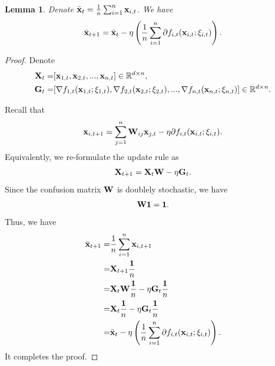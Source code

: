 \documentclass{article}
\newtheorem{Lemma}{\bf{Lemma}}
\begin{document}
\begin{Lemma}
\label{lemma_average_update_rule}
Denote $\bar{{\bf x}}_t = \frac{1}{n}\sum_{i=1}^n {\bf x}_{i,t}$. We have
\begin{align}
\nonumber
\bar{{\bf x}}_{t+1} =  \bar{{\bf x}}_{t} - \eta \left( \frac{1}{n} \sum_{i=1}^n \partial f_{i,t}({\bf x}_{i,t}; \xi_{i,t}) \right). 
\end{align}
\end{Lemma}
\begin{proof}
Denote 
\begin{align}
\nonumber
{\bf X}_t = &  [{\bf x}_{1,t}, {\bf x}_{2,t}, ..., {\bf x}_{n,t}] \in \mathbb{R}^{d\times n}, \\ \nonumber
{\bf G}_t = & [\nabla f_{1,t}({\bf x}_{1,t};\xi_{1,t}), \nabla f_{2,t}({\bf x}_{2,t};\xi_{2,t}), ..., \nabla f_{n,t}({\bf x}_{n,t};\xi_{n,t})] \in \mathbb{R}^{d\times n}.
\end{align}

Recall that 
\begin{align}
\nonumber
{\bf x}_{i,t+1} = \sum_{j=1}^n {\bf W}_{ij}{\bf x}_{j,t} - \eta \partial f_{i,t}({\bf x}_{i,t};\xi_{i,t}).
\end{align} Equivalently, we re-formulate the update rule as
\begin{align}
\nonumber
{\bf X}_{t+1} = {\bf X}_{t}{\bf W} - \eta {\bf G}_t.
\end{align} Since the confusion matrix ${\bf W}$ is doublely stochastic, we have
\begin{align}
\nonumber
{\bf W} {\bf 1} = {\bf 1}.
\end{align} Thus, we have
\begin{align}
\nonumber
\bar{{\bf x}}_{t+1} = & \frac{1}{n}\sum_{i=1}^n {\bf x}_{i,t+1} \\ \nonumber
= & {\bf X}_{t+1}\frac{{\bf 1}}{n} \\ \nonumber 
= & {\bf X}_{t}{\bf W}\frac{{\bf 1}}{n} - \eta {\bf G}_t\frac{{\bf 1}}{n} \\ \nonumber
= & {\bf X}_{t}\frac{{\bf 1}}{n} - \eta {\bf G}_t\frac{{\bf 1}}{n} \\ \nonumber
=& \bar{{\bf x}}_{t} - \eta \left( \frac{1}{n} \sum_{i=1}^n \partial f_{i,t}({\bf x}_{i,t}; \xi_{i,t}) \right). 
\end{align} It completes the proof.
\end{proof}
\end{document}
